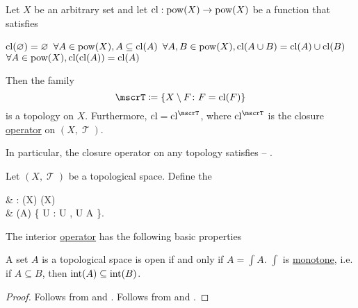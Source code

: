 \begin{proposition}\label{thm:closure_operator_axioms}\mcite\cite[14]{Engelking1989}
  Let \( X \) be an arbitrary set and let \( \operatorname{cl}: \operatorname{pow}(X) \to \operatorname{pow}(X) \) be a function that satisfies
  \begin{thmenum}
     \( \operatorname{cl}(\varnothing) = \varnothing \)
     \( \forall A \in \operatorname{pow}(X), A \subseteq \operatorname{cl}(A) \)
     \( \forall A, B \in \operatorname{pow}(X), \operatorname{cl}(A \cup B) = \operatorname{cl}(A) \cup \operatorname{cl}(B) \)
     \( \forall A \in \operatorname{pow}(X), \operatorname{cl}(\operatorname{cl}(A)) = \operatorname{cl}(A) \)
  \end{thmenum}

  Then the family
  \begin{equation*}
    \mscrT \coloneqq \{ X \setminus F \colon F = \cl(F) \}
  \end{equation*}
  is a topology on \( X \). Furthermore, \( \cl = \cl^{\mscrT} \), where \( \cl^{\mscrT} \) is the closure \hyperref[def:closure_operator]{operator} on \( (X, \mscrT) \).

  In particular, the closure operator on any topology satisfies  -- .
\end{proposition}

\begin{definition}\label{def:interior_operator}\mcite\cite[15]{Engelking1989}
  Let \( (X, \mscrT) \) be a topological space. Define the 
  \begin{balign*}
     & \inter: \pow(X) \to \pow(X)                                     \\
     & \inter(A) \coloneqq \bigcup \{ U : U \in \mscrT, U \subseteq A \}.
  \end{balign*}
\end{definition}

\begin{proposition}\label{thm:interior_operator_properties}
  The interior \hyperref[def:interior_operator]{operator} has the following basic properties
  \begin{thmenum}
     A set \( A \) is a topological space is open if and only if \( A = \int A \).
     \( \int \) is \hyperref[def:monotone_map]{monotone}, i.e. if \( A \subseteq B \), then \( \operatorname{int}(A) \subseteq \operatorname{int}(B) \).
  \end{thmenum}
\end{proposition}
\begin{proof}
   Follows from  and .
   Follows from  and .
\end{proof}

